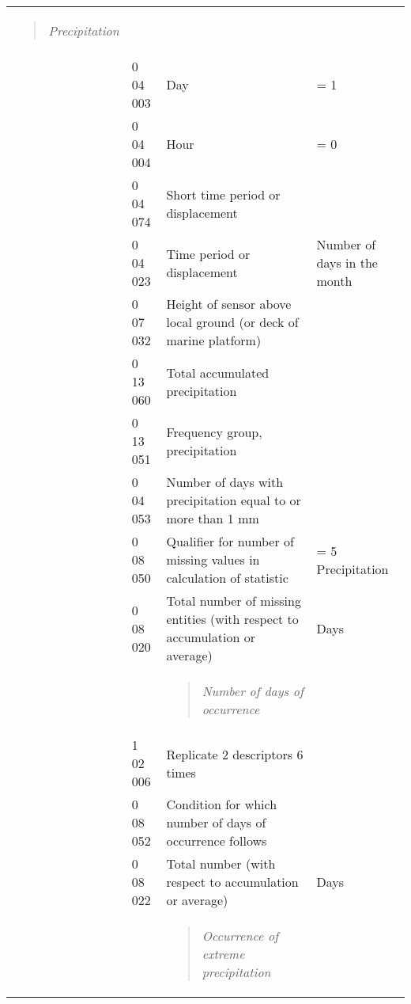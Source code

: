 \begin{longtable}[]{@{}llll@{}}
\begin{minipage}[t]{0.22\columnwidth}
\begin{quote}
\emph{Precipitation}
\end{quote}\strut
\end{minipage} & \begin{minipage}[t]{0.22\columnwidth}\raggedright
\strut
\end{minipage}\tabularnewline
& 0 04 003 & Day & = 1\tabularnewline
& 0 04 004 & Hour & = 0\tabularnewline
& 0 04 074 & Short time period or displacement &\tabularnewline
& 0 04 023 & Time period or displacement & Number of days in the month\tabularnewline
& 0 07 032 & Height of sensor above local ground (or deck of marine platform) &\tabularnewline
& 0 13 060 & Total accumulated precipitation &\tabularnewline
& 0 13 051 & Frequency group, precipitation &\tabularnewline
& 0 04 053 & Number of days with precipitation equal to or more than 1 mm &\tabularnewline
& 0 08 050 & Qualifier for number of missing values in calculation of statistic & = 5 Precipitation\tabularnewline
& 0 08 020 & Total number of missing entities (with respect to accumulation or average) & Days\tabularnewline
\begin{minipage}[t]{0.22\columnwidth}\raggedright
\strut
\end{minipage} & \begin{minipage}[t]{0.22\columnwidth}\raggedright
\strut
\end{minipage} & \begin{minipage}[t]{0.22\columnwidth}\raggedright
\begin{quote}
\emph{Number of days of occurrence}
\end{quote}\strut
\end{minipage} & \begin{minipage}[t]{0.22\columnwidth}\raggedright
\strut
\end{minipage}\tabularnewline
& 1 02 006 & Replicate 2 descriptors 6 times &\tabularnewline
& 0 08 052 & Condition for which number of days of occurrence follows &\tabularnewline
& 0 08 022 & Total number (with respect to accumulation or average) & Days\tabularnewline
\begin{minipage}[t]{0.22\columnwidth}\raggedright
\strut
\end{minipage} & \begin{minipage}[t]{0.22\columnwidth}\raggedright
\strut
\end{minipage} & \begin{minipage}[t]{0.22\columnwidth}\raggedright
\begin{quote}
\emph{Occurrence of extreme precipitation}

\end{quote}
\end{minipage}
\end{longtable}
